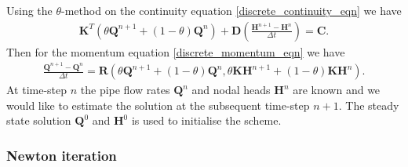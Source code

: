 \documentclass[12pt]{article}
\begin{document}
Using the $\theta$-method on the continuity equation \eqref{discrete_continuity_eqn} we have
\begin{align}
\mathbf{K}^T \left( \theta \mathbf{Q}^{n+1} + (1-\theta)\mathbf{Q}^{n} \right) + \mathbf{D} \left( \frac{\mathbf{H}^{n+1} - \mathbf{H}^{n}}{\Delta t} \right) = \mathbf{C}.
\end{align}
{ \color{green} Then for the momentum equation \eqref{discrete_momentum_eqn} we have
\begin{align}
\frac{\mathbf{Q}^{n+1} - \mathbf{Q}^{n}}{\Delta t} = \mathbf{R}\left( \theta \mathbf{Q}^{n+1} + (1-\theta)\mathbf{Q}^{n}, \theta \mathbf{K} \mathbf{H}^{n+1} + (1-\theta) \mathbf{K} \mathbf{H}^n \right).
\end{align}}
At time-step $n$ the pipe flow rates $\mathbf{Q}^{n}$ and nodal heads $\mathbf{H}^{n}$ are known and we would like to estimate the solution at the subsequent time-step $n+1$. The steady state solution $\mathbf{Q}^{0}$ and $\mathbf{H}^{0}$ is used to initialise the scheme.

\subsubsection{Newton iteration} 
\end{document}
